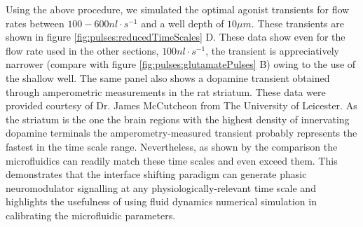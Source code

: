 Using the above procedure, we simulated the optimal agonist transients for flow rates between \(100-600 nl\cdot s^{-1}\) and a well depth of \(10\mu m\). These transients are shown in figure \ref{fig:pulses:reducedTimeScales} D. These data show even for the flow rate used in the other sections, \(100 nl\cdot s^{-1}\), the transient is appreciatively narrower (compare with figure \ref{fig:pulses:glutamatePulses} B) owing to the use of the shallow well. The same panel also shows a dopamine transient obtained through amperometric measurements in the rat striatum. These data were provided courtesy of Dr. James McCutcheon from The University of Leicester. As the striatum is the one the brain regions with the highest density of innervating dopamine terminals the amperometry-measured transient probably represents the fastest in the time scale range. Nevertheless, as shown by the comparison the microfluidics can readily match these time scales and even exceed them. This demonstrates that the interface shifting paradigm can generate phasic neuromodulator signalling at any physiologically-relevant time scale and highlights the usefulness of using fluid dynamics numerical simulation in calibrating the microfluidic parameters.


